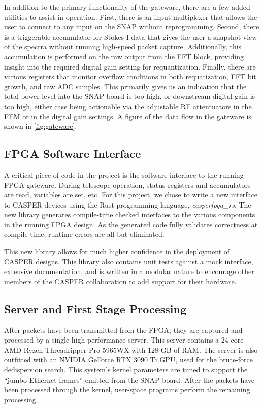 In addition to the primary functionality of the gateware, there are a few added utilities to assist in operation.
First, there is an input multiplexer that allows the user to connect to any input on the SNAP without reprogramming.
Second, there is a triggerable accumulator for Stokes I data that gives the user a snapshot view of the spectra without running high-speed packet capture.
Additionally, this accumulation is performed on the raw output from the FFT block, providing insight into the required digital gain setting for requantization.
Finally, there are various registers that monitor overflow conditions in both requatization, FFT bit growth, and raw ADC samples.
This primarily gives us an indication that the total power level into the SNAP board is too high, or downstream digital gain is too high, either case being actionable via the adjustable RF attentuators in the FEM or in the digital gain settings.
A figure of the data flow in the gateware is shown in \autoref{fig:gateware}.

\subsection{FPGA Software Interface}

A critical piece of code in the project is the software interface to the running FPGA gateware.
During telescope operation, status registers and accumulators are read, variables are set, etc.
For this project, we chose to write a new interface to CASPER devices using the Rust programming language, \textit{casperfpga\_rs}.
The new library generates compile-time checked interfaces to the various components in the running FPGA design.
As the generated code fully validates correctness at compile-time, runtime errors are all but eliminated.

This new library allows for much higher confidence in the deployment of CASPER designs.
This library also contains unit tests against a mock interface, extensive documentation, and is written in a modular nature to encourage other members of the CASPER collaboration to add support for their hardware.

\subsection{Server and First Stage Processing} \label{subsec:t0}

After packets have been transmitted from the FPGA, they are captured and processed by a single high-performance server.
This server contains a 24-core AMD Ryzen Threadripper Pro 5965WX with 128 GB of RAM.
The server is also outfitted with an NVIDIA GeForce RTX 3090 Ti GPU, used for the brute-force dedispersion search.
This system's kernel parameters are tuned to support the “jumbo Ethernet frames” emitted from the SNAP board.
After the packets have been processed through the kernel, user-space programs perform the remaining processing.


